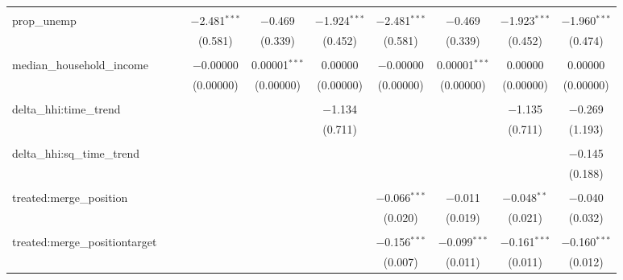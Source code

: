 \begin{table}[H]
{\begin{tabular}{@{\extracolsep{5pt}}lccccccccc}
   & & & & & & & & & \\  

  prop\_unemp &  &  & $-$2.481$^{***}$ & $-$0.469 & $-$1.924$^{***}$ & $-$2.481$^{***}$ & $-$0.469 & $-$1.923$^{***}$ & $-$1.960$^{***}$ \\  

   &  &  & (0.581) & (0.339) & (0.452) & (0.581) & (0.339) & (0.452) & (0.474) \\  

   & & & & & & & & & \\  

  median\_household\_income &  &  & $-$0.00000 & 0.00001$^{***}$ & 0.00000 & $-$0.00000 & 0.00001$^{***}$ & 0.00000 & 0.00000 \\  

   &  &  & (0.00000) & (0.00000) & (0.00000) & (0.00000) & (0.00000) & (0.00000) & (0.00000) \\  

   & & & & & & & & & \\  

  delta\_hhi:time\_trend &  &  &  &  & $-$1.134 &  &  & $-$1.135 & $-$0.269 \\  

   &  &  &  &  & (0.711) &  &  & (0.711) & (1.193) \\  

   & & & & & & & & & \\  

  delta\_hhi:sq\_time\_trend &  &  &  &  &  &  &  &  & $-$0.145 \\  

   &  &  &  &  &  &  &  &  & (0.188) \\  

   & & & & & & & & & \\  

  treated:merge\_position &  &  &  &  &  & $-$0.066$^{***}$ & $-$0.011 & $-$0.048$^{**}$ & $-$0.040 \\  

   &  &  &  &  &  & (0.020) & (0.019) & (0.021) & (0.032) \\  

   & & & & & & & & & \\  

  treated:merge\_positiontarget &  &  &  &  &  & $-$0.156$^{***}$ & $-$0.099$^{***}$ & $-$0.161$^{***}$ & $-$0.160$^{***}$ \\  

   &  &  &  &  &  & (0.007) & (0.011) & (0.011) & (0.012) \\  


\end{tabular}}
\end{table}
